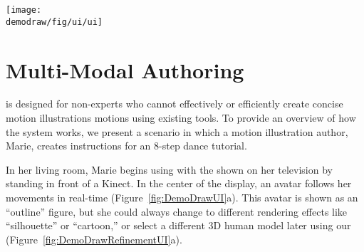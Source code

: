 
\begin{figure*}[!t]
  \centering
  \texttt{[image: \\demodraw/fig/ui/ui]}
  \caption{\systemname{} authoring UI: Using the \phaseI{}, an author sees an avatar following her real-time movement (a). During recording (initiated by voice command ``Start''), real-time feedback shows the speech labels (b). Once a recording is completed by voice command ``Stop'', the motion visualization and a timeline are immediately available (c) for the author to review, and a step-by-step overview will be generated.}
  \label{fig:DemoDrawUI}
\end{figure*}

\section{Multi-Modal Authoring}

\systemname{} is designed for non-experts who cannot effectively or efficiently create concise motion illustrations motions using existing tools.
To provide an overview of how the system works, we present a scenario in which a motion illustration author, Marie, creates instructions for an 8-step dance tutorial.

In her living room, Marie begins using \systemname{} with the \phaseI{} shown on her television by standing in front of a Kinect. In the center of the display, an avatar follows her movements in real-time (Figure~\ref{fig:DemoDrawUI}a).
This avatar is shown as an ``outline'' figure, but she could always change to different rendering effects like ``silhouette'' or ``cartoon,'' or select a different 3D human model later using our \phaseII{} (Figure~\ref{fig:DemoDrawRefinementUI}a).


